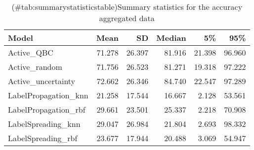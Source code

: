 \begin{table}[!h]

\caption{(\#tab:summarystatisticstable)Summary statistics for the accuracy aggregated data}
\centering
\begin{tabular}[t]{lrrrrr}
\toprule
Model & Mean & SD & Median & 5\% & 95\%\\
\midrule
Active\_QBC & 71.278 & 26.397 & 81.916 & 21.398 & 96.960\\
Active\_random & 71.756 & 26.523 & 81.271 & 19.318 & 97.222\\
Active\_uncertainty & 72.662 & 26.346 & 84.740 & 22.547 & 97.289\\
LabelPropagation\_knn & 21.258 & 17.544 & 16.667 & 2.128 & 53.561\\
LabelPropagation\_rbf & 29.661 & 23.501 & 25.337 & 2.218 & 70.908\\
LabelSpreading\_knn & 29.047 & 26.984 & 21.804 & 2.693 & 98.332\\
LabelSpreading\_rbf & 23.677 & 17.944 & 20.488 & 3.069 & 54.947\\
\bottomrule
\end{tabular}
\end{table}
